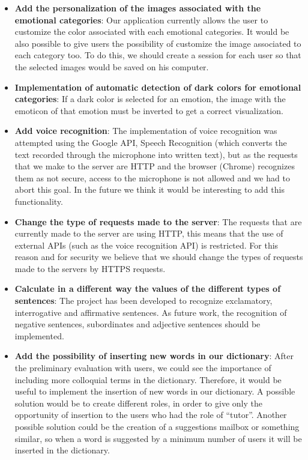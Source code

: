 \begin{itemize}
	\item \textbf{Add the personalization of the images associated with the emotional categories}: Our application currently allows the user to customize the color associated with each emotional categories. It would be also possible to give users the possibility of customize the image associated to each category too. To do this, we should create a session for each user so that the selected images would be saved on his computer.
	\item \textbf{Implementation of automatic detection of dark colors for emotional categories}: If a dark color is selected for an emotion, the image with the emoticon of that emotion must be inverted to get a correct visualization.
	\item \textbf{Add voice recognition}: The implementation of voice recognition was attempted using the Google API, Speech Recognition (which converts the text recorded through the microphone into written text), but as the requests that we make to the server are HTTP and the browser (Chrome) recognizes them as not secure, access to the microphone is not allowed and we had to abort this goal. In the future we think it would be interesting to add this functionality.
	\item \textbf{Change the type of requests made to the server}: The requests that are currently made to the server are using HTTP, this means that the use of external APIs (such as the voice recognition API) is restricted. For this reason and for security we believe that we should change the types of requests made to the servers by HTTPS requests.
	\item \textbf{Calculate in a different way the values of the different types of sentences}: The project has been developed to recognize exclamatory, interrogative and affirmative sentences. As future work, the recognition of negative sentences, subordinates and adjective sentences should be implemented.
	\item \textbf{Add the possibility of inserting new words in our dictionary}: After the preliminary evaluation with users, we could see the importance of including more colloquial terms in the dictionary. Therefore, it would be useful to implement the insertion of new words in our dictionary. A possible solution would be to create different roles, in order to give only the opportunity of insertion to the users who had the role of ``tutor''. Another possible solution could be the creation of a suggestions mailbox or something similar, so when a word is suggested by a minimum number of users it will be inserted in the dictionary.

\end{itemize}
